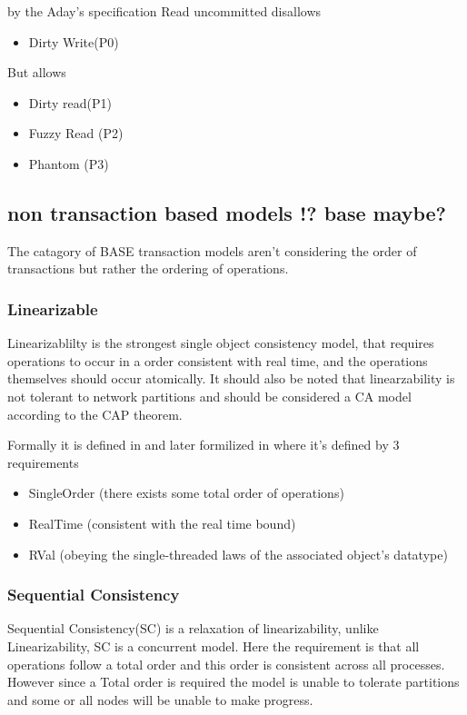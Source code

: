 \documentclass[a4paper,10pt,titlepage]{report}
\begin{document}
    by the Aday's specification Read uncommitted disallows
    \begin{itemize}
        \item Dirty Write(P0)
    \end{itemize}
    But allows
    \begin{itemize}
        \item Dirty read(P1)
        \item Fuzzy Read (P2)
        \item Phantom (P3)
    \end{itemize}

    \subsection{non transaction based models !? base maybe?}
    The catagory of BASE transaction models aren't considering the order of transactions but rather the ordering of operations.

    \subsubsection{Linearizable}
    Linearizablilty is the strongest single object consistency model, that requires operations to occur in a order consistent with real time, and the operations themselves should occur atomically. It should also be noted that linearzability is not tolerant to network partitions and should be considered a CA model according to the CAP theorem.

    Formally it is defined in \cite{Linearizability} and later formilized in \cite{ConsistencyinNonTransactionalDistributedStorageSystems} where it's defined by 3 requirements


    \begin{itemize}
        \item SingleOrder (there exists some total order of operations)
        \item RealTime (consistent with the real time bound)
        \item RVal (obeying the single-threaded laws of the associated object's datatype)
    \end{itemize}


    \subsubsection{Sequential Consistency}
    Sequential Consistency(SC) is a relaxation of linearizability, unlike Linearizability, SC is a concurrent model. Here the requirement is that all operations follow a total order and this order is consistent across all processes. However since a Total order is required the model is unable to tolerate partitions and some or all nodes will be unable to make progress. \\
\end{document}
